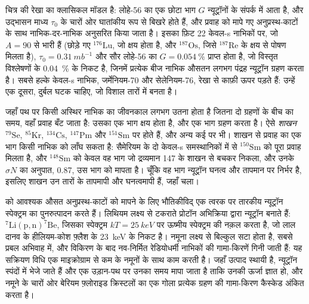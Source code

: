 चित्र की रेखा  का क्लासिकल मॉडल है: लोहे-56 का एक छोटा भाग
$G$ न्यूट्रॉनों के संपर्क में आता है, और उद्भासन माध्य
$\tau_0$ के चारों ओर घातांकीय रूप से बिखरे होते हैं, और प्रवाह को
मापे गए अनुप्रस्थ-काटों के साथ नाभिक-दर-नाभिक अनुसरित किया जाता है। इसका फ़िट 22 केवल-s
नाभिकों पर, जो $A = 90$ से भारी हैं (छोड़े गए $^{176}\mathrm{Lu}$, जो
क्षय होता है, और $^{187}\mathrm{Os}$, जिसे
$^{187}\mathrm{Re}$ के क्षय से पोषण मिलता है), $\tau_0 = \qty{0.31}{mb^{-1}}$ और
सौर लोहे-56 का $G = \qty{0.054}{\percent}$ प्राप्त होता है, जो विस्तृत विश्लेषणों के
\qty{0.04}{\percent} के निकट है, जिनमें प्रत्येक बीज नाभिक औसतन लगभग
पंद्रह न्यूट्रॉन ग्रहण करता है। सबसे हल्के केवल-s
नाभिक, जर्मेनियम-70 और सेलेनियम-76, रेखा से काफ़ी ऊपर पड़ते हैं:
उन्हें एक दूसरा, दुर्बल घटक चाहिए, जो विशाल तारों में बनता है।

जहाँ पथ पर किसी अस्थिर नाभिक का जीवनकाल लगभग उतना होता है जितना दो ग्रहणों के बीच का समय,
वहाँ प्रवाह बँट जाता है: उसका एक भाग क्षय होता है, और एक भाग ग्रहण करता है।
ऐसे \emph{शाखन} $^{79}\mathrm{Se}$, $^{85}\mathrm{Kr}$,
$^{134}\mathrm{Cs}$, $^{147}\mathrm{Pm}$ और $^{151}\mathrm{Sm}$ पर होते हैं, और अन्य कई पर भी।
शाखन से प्रवाह का एक भाग किसी नाभिक को लाँघ सकता है: सैमेरियम के दो केवल-s समस्थानिकों में से
$^{150}\mathrm{Sm}$ को पूरा प्रवाह मिलता है, और $^{148}\mathrm{Sm}$ को केवल वह भाग
जो द्रव्यमान 147 के शाखन से बचकर निकला, और उनके $\sigma N$ का अनुपात,
\num{0.87}, उस भाग को मापता है।
चूँकि वह भाग न्यूट्रॉन घनत्व और तापमान पर निर्भर है, इसलिए शाखन
उन तारों के तापमापी और घनत्वमापी हैं,
जहाँ  चला।

\begin{inthelab}[ग्रहण अनुप्रस्थ-काट का मापन]
 को आवश्यक औसत अनुप्रस्थ-काटों को मापने के लिए भौतिकीविद्
एक त्वरक पर तारकीय न्यूट्रॉन स्पेक्ट्रम का पुनरुत्पादन करते हैं।
लिथियम लक्ष्य से टकराते प्रोटॉन अभिक्रिया द्वारा न्यूट्रॉन बनाते हैं:
$^{7}\mathrm{Li}(\mathrm{p},\mathrm{n})^{7}\mathrm{Be}$, जिसका स्पेक्ट्रम
$kT = \qty{25}{keV}$ पर ऊष्मीय स्पेक्ट्रम की नक़ल करता है, जो लाल दानव के
हीलियम-कोश फ़्लैश के \qty{23}{keV} के निकट है। नमूना लक्ष्य से
बिल्कुल सटा होता है, सबसे प्रबल अभिवाह में, और विकिरण के बाद
नव-निर्मित रेडियोधर्मी नाभिकों की गामा-किरणें गिनी जाती हैं:
यह सक्रियण विधि एक माइक्रोग्राम से कम के नमूनों के साथ काम करती है।
जहाँ उत्पाद स्थायी है, न्यूट्रॉन स्पंदों में भेजे जाते हैं और एक उड़ान-पथ पर
उनका समय मापा जाता है ताकि उनकी ऊर्जा ज्ञात हो, और नमूने के चारों ओर
बेरियम फ़्लोराइड क्रिस्टलों का एक गोला प्रत्येक ग्रहण की गामा-किरण
कैस्केड अंकित करता है।
\end{inthelab}

